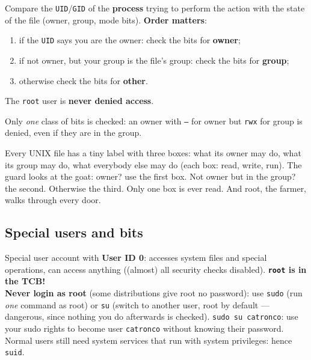 \begin{algbox}[title=UNIX access control in action]
Compare the \texttt{UID}/\texttt{GID} of the \textbf{process} trying to perform the
action with the state of the file (owner, group, mode bits). \textbf{Order matters}:
\begin{enumerate}
  \item if the \texttt{UID} says you are the owner: check the bits for \textbf{owner};
  \item if not owner, but your group is the file's group: check the bits for
        \textbf{group};
  \item otherwise check the bits for \textbf{other}.
\end{enumerate}
The \texttt{root} user is \textbf{never denied access}.
\end{algbox}

\begin{warnbox}[title=Order matters]
Only \emph{one} class of bits is checked: an owner with \texttt{---} for owner but
\texttt{rwx} for group is denied, even if they are in the group.
\end{warnbox}

\begin{goatbox}
Every UNIX file has a tiny label with three boxes: what its owner may do, what its group may do,
what everybody else may do (each box: read, write, run). The guard looks at the goat: owner? use
the first box. Not owner but in the group? the second. Otherwise the third. Only one box is ever
read. And root, the farmer, walks through every door.
\end{goatbox}

\subsection{Special users and bits}

\begin{defnbox}[title=Super user (\texttt{root})]
Special user account with \textbf{User ID 0}: accesses system files and special
operations, can access anything ((almost) all security checks disabled).
\textbf{\texttt{root} is in the TCB!} \\
\textbf{Never login as root} (some distributions give root no password): use
\texttt{sudo} (run \emph{one} command as root) or \texttt{su} (switch to another user, root by
default --- dangerous, since nothing you do afterwards is checked). \texttt{sudo su catronco}:
use your sudo rights to become user \texttt{catronco} without knowing their password. Normal users
still need system services that run with system privileges: hence \texttt{suid}.
\end{defnbox}

